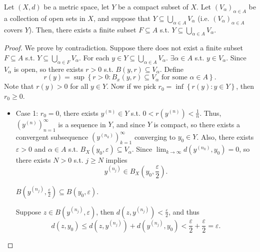 \begin{theorem} \label{thm: compact to subcover}
    Let \((X, d)\) be a metric space, let \(Y\) be a compact subset of \(X\). Let \(\left( V_\alpha  \right)_{\alpha \in A} \) be a collection of open sets in \(X\), and suppose that \(Y \subseteq \bigcup_{\alpha \in A} V_\alpha  \) (i.e. \(\left( V_\alpha  \right)_{\alpha \in A} \) covers \(Y\)). Then, there exists a finite subset \(F \subseteq A\) s.t. \(Y \subseteq \bigcup_{\alpha \in A} V_\alpha  \).        
\end{theorem}
\begin{proof}
    We prove by contradiction. Suppose there does not exist a finite subset \(F \subseteq A\) s.t. \(Y \subseteq \bigcup_{\alpha \in F} V_\alpha  \).  
        For each \(y \in Y \subseteq \bigcup_{\alpha \in A} V_\alpha  \). \(\exists \alpha \in A\) s.t. \(y \in V_\alpha \). Since \(V_\alpha \) is open, so there exists \(r > 0\) s.t. \(B(y, r) \subseteq V_\alpha \). Define 
        \[
            r(y) = \sup \left\{ r > 0 : B_x(y, r) \subseteq V_\alpha \text{ for some } \alpha \in A \right\}. 
        \] Note that \(r(y) > 0\) for all \(y \in Y\). Now if we pick \(r_0 = \inf \left\{ r(y) : y\in Y \right\} \), then \(r_0 \ge 0\). 
        \begin{itemize}
            \item Case 1: \(r_0 = 0\), there exists \(y^{(n)} \in Y\) s.t. \( 0 < r\left( y^{(n)} \right) < \frac{1}{n} \). Thus, \(\left( y^{(n)} \right)_{n=1}^{\infty}  \) is a sequence in \(Y\), and since \(Y\) is compact, so there exists a convergent subsequence \(\left( y^{(n_k)} \right)_{k=1}^{\infty}  \) converging to \(y_0 \in Y\). Also, there exists \(\varepsilon > 0\) and \(\alpha \in A\) s.t. \(B_X(y_0, \varepsilon ) \subseteq V_\alpha \). Since \(\lim_{k \to \infty} d\left( y^{(n_k)}, y_0 \right) = 0  \), so there exists \(N > 0\) s.t. \(j \ge N\) implies 
            \[
                y^{(n_j)} \in B_X \left( y_0, \frac{\varepsilon}{2} \right).
            \]
            \begin{claim}
                \(B\left( y^{(n_j)}, \frac{\varepsilon}{2} \right) \subseteq B\left( y_0, \varepsilon  \right)  \). 
            \end{claim}
            \begin{explanation}
                Suppose \(z \in B\left( y^{(n_j)}, \varepsilon  \right) \), then \(d\left( z, y^{(n_j)} \right) < \frac{\varepsilon}{2}\), and thus 
                \[
                    d(z, y_0) \le d\left( z, y^{(n_j)} \right) + d\left( y^{(n_j)}, y_0 \right) < \frac{\varepsilon}{2} + \frac{\varepsilon}{2} = \varepsilon.  
\]
\end{explanation}
\end{itemize}
\end{proof}
